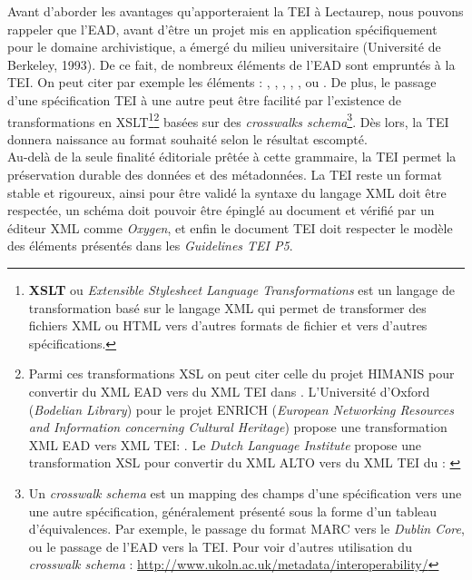 \bigskip
Avant d'aborder les avantages qu'apporteraient la TEI à Lectaurep, nous pouvons rappeler que l'EAD, avant d'être un projet mis en application spécifiquement pour le domaine archivistique, a émergé du milieu universitaire (Université de Berkeley, 1993). De ce fait, de nombreux éléments de l'EAD sont empruntés à la TEI. On peut citer par exemple les éléments  : , , , , , ou .
De plus, le passage d'une spécification TEI à une autre peut être facilité par l'existence de transformations en XSLT\footnote{\textbf{XSLT} ou \textit{Extensible Stylesheet Language Transformations} est un langage de transformation basé sur le langage XML qui permet de transformer des fichiers XML ou HTML vers d'autres formats de fichier et vers d'autres spécifications.}\footnote{Parmi ces transformations XSL on peut citer celle du projet HIMANIS pour convertir du XML EAD vers du XML TEI dans \cite{stutzmann_ead-tei_2019}. L'Université d'Oxford (\textit{Bodelian Library}) pour le projet ENRICH (\textit{European Networking Resources and Information concerning Cultural Heritage}) propose une transformation XML EAD vers XML TEI: \cite{university_of_oxford_-__bodleian_library_ead2enrich_nodate}. Le \textit{Dutch Language Institute} propose une transformation XSL pour convertir du XML ALTO vers du XML TEI du : \cite{dutch_language_institute_inl_alto2tei_nodate}} basées sur des \textit{crosswalks schema}\footnote{Un \textit{crosswalk schema} est un mapping des champs d'une spécification vers une une autre spécification, généralement présenté sous la forme d'un tableau d'équivalences. Par exemple, le passage du format MARC vers le \textit{Dublin Core}, ou le passage de l'EAD vers la TEI. Pour voir d'autres utilisation du \textit{crosswalk schema} : \url{http://www.ukoln.ac.uk/metadata/interoperability/}}. Dès lors, la TEI donnera naissance au format souhaité selon le résultat escompté.\\

Au-delà de la seule finalité éditoriale prêtée à cette grammaire, la TEI permet la préservation durable des données et des métadonnées. La TEI reste un format stable et rigoureux, ainsi pour être validé la syntaxe du langage XML doit être respectée, un schéma doit pouvoir être épinglé au document et vérifié par un éditeur XML comme \textit{Oxygen}, et enfin le document TEI doit respecter le modèle des éléments présentés dans les \textit{Guidelines TEI P5}.
\newpage

